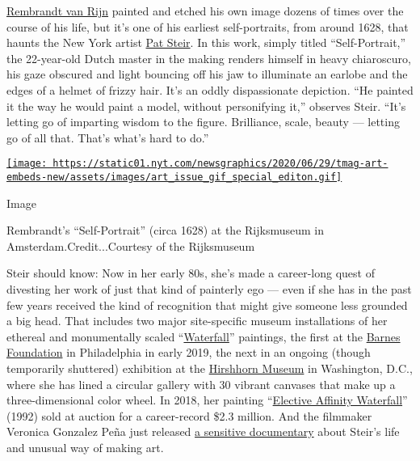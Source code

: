 \href{https://www.nytimes.com/2019/02/27/magazine/rembrandt-jan-six.html}{Rembrandt
van Rijn} painted and etched his own image dozens of times over the
course of his life, but it's one of his earliest self-portraits, from
around 1628, that haunts the New York artist
\href{https://www.nytimes.com/2019/01/18/arts/design/pat-steir-barnes-foundation-waterfall-kiki-smith-feminist.html}{Pat
Steir}. In this work, simply titled ``Self-Portrait,'' the 22-year-old
Dutch master in the making renders himself in heavy chiaroscuro, his
gaze obscured and light bouncing off his jaw to illuminate an earlobe
and the edges of a helmet of frizzy hair. It's an oddly dispassionate
depiction. ``He painted it the way he would paint a model, without
personifying it,'' observes Steir. ``It's letting go of imparting wisdom
to the figure. Brilliance, scale, beauty --- letting go of all that.
That's what's hard to do.''

\href{https://www.nytimes.com/issue/t-magazine/2020/07/02/true-believers-art-issue}{\texttt{[image: https://static01.nyt.com/newsgraphics/2020/06/29/tmag-art-embeds-new/assets/images/art\_issue\_gif\_special\_editon.gif]}}

Image

Rembrandt's ``Self-Portrait'' (circa 1628) at the Rijksmuseum in
Amsterdam.Credit...Courtesy of the Rijksmuseum

Steir should know: Now in her early 80s, she's made a career-long quest
of divesting her work of just that kind of painterly ego --- even if she
has in the past few years received the kind of recognition that might
give someone less grounded a big head. That includes two major
site-specific museum installations of her ethereal and monumentally
scaled
``\href{https://www.metmuseum.org/art/collection/search/497082}{Waterfall}''
paintings, the first at the
\href{https://www.barnesfoundation.org/whats-on/pat-steir-silent-secret-waterfalls}{Barnes
Foundation} in Philadelphia in early 2019, the next in an ongoing
(though temporarily shuttered) exhibition at the
\href{https://hirshhorn.si.edu/exhibitions/pat-steir/}{Hirshhorn Museum}
in Washington, D.C., where she has lined a circular gallery with 30
vibrant canvases that make up a three-dimensional color wheel. In 2018,
her painting
``\href{https://www.phillips.com/detail/pat-steir/NY010318/3}{Elective
Affinity Waterfall}'' (1992) sold at auction for a career-record \$2.3
million. And the filmmaker Veronica Gonzalez Peña just released
\href{https://patsteirthemovie.com/}{a sensitive documentary} about
Steir's life and unusual way of making art.

